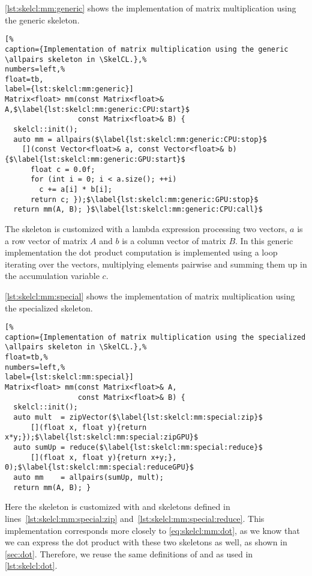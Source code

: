 \autoref{lst:skelcl:mm:generic} shows the implementation of matrix multiplication using the generic \allpairs skeleton.
\begin{lstlisting}[%                                                             
caption={Implementation of matrix multiplication using the generic \allpairs skeleton in \SkelCL.},%
numbers=left,%
float=tb,
label={lst:skelcl:mm:generic}]
Matrix<float> mm(const Matrix<float>& A,$\label{lst:skelcl:mm:generic:CPU:start}$
                 const Matrix<float>& B) {
  skelcl::init();
  auto mm = allpairs($\label{lst:skelcl:mm:generic:CPU:stop}$
    [](const Vector<float>& a, const Vector<float>& b) {$\label{lst:skelcl:mm:generic:GPU:start}$
      float c = 0.0f;
      for (int i = 0; i < a.size(); ++i)
        c += a[i] * b[i];
      return c; });$\label{lst:skelcl:mm:generic:GPU:stop}$
  return mm(A, B); }$\label{lst:skelcl:mm:generic:CPU:call}$
\end{lstlisting}
The skeleton is customized with a lambda expression processing two vectors, $a$ is a row vector of matrix $A$ and $b$ is a column vector of matrix $B$.
In this generic implementation the dot product computation is implemented using a  loop iterating over the vectors, multiplying elements pairwise and summing them up in the accumulation variable $c$.

\autoref{lst:skelcl:mm:special} shows the implementation of matrix multiplication using the specialized \allpairs skeleton.
\begin{lstlisting}[%                                                             
caption={Implementation of matrix multiplication using the specialized \allpairs skeleton in \SkelCL.},%
float=tb,%                                                                       
numbers=left,%
label={lst:skelcl:mm:special}]
Matrix<float> mm(const Matrix<float>& A,
                 const Matrix<float>& B) {
  skelcl::init();
  auto mult  = zipVector($\label{lst:skelcl:mm:special:zip}$
      [](float x, float y){return x*y;});$\label{lst:skelcl:mm:special:zipGPU}$
  auto sumUp = reduce($\label{lst:skelcl:mm:special:reduce}$
      [](float x, float y){return x+y;}, 0);$\label{lst:skelcl:mm:special:reduceGPU}$
  auto mm    = allpairs(sumUp, mult);
  return mm(A, B); }
\end{lstlisting}
Here the \allpairs skeleton is customized with \zip and \reduce skeletons defined in lines~\ref{lst:skelcl:mm:special:zip} and~\ref{lst:skelcl:mm:special:reduce}.
This implementation corresponds more closely to \autoref{eq:skelcl:mm:dot}, as we know that we can express the dot product with these two skeletons as well, as shown in \autoref{sec:dot}.
Therefore, we reuse the same definitions of  and  as used in \autoref{lst:skelcl:dot}.

